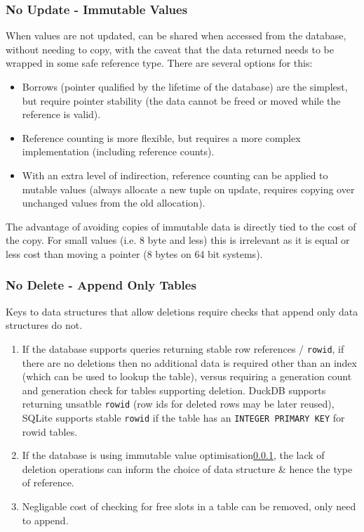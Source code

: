 \subsubsection{No Update - Immutable Values}
\label{sec:mut_opt}
When values are not updated, can be shared when accessed from the database, without needing to copy, 
with the caveat that the data returned needs to be wrapped in some safe reference type. There are several options for this:
\begin{itemize}
    \setlength\itemsep{0em}
    \item Borrows (pointer qualified by the lifetime of the database) are the simplest, but require pointer stability (the data cannot be freed or moved while the reference is valid).
    \item Reference counting is more flexible, but requires a more complex implementation (including reference counts).
    \item With an extra level of indirection, reference counting can be applied to mutable values (always allocate a new tuple on update, requires copying over unchanged values from the old allocation).
\end{itemize}
The advantage of avoiding copies of immutable data is directly tied to the cost of the copy. For small values (i.e. 8 byte and less) 
this is irrelevant as it is equal or less cost than moving a pointer (8 bytes on 64 bit systems).

\subsubsection{No Delete - Append Only Tables}
\label{sec:app_opt}
Keys to data structures that allow deletions require checks that append only data structures do not.
\begin{enumerate}
    \setlength\itemsep{0em}
    \item If the database supports queries returning stable row references / \texttt{rowid}, if there are no deletions then no additional data is required other than an index (which can be used to lookup the table), versus requiring a generation count and generation check for tables supporting deletion. DuckDB supports returning unsatble \texttt{rowid} (row ids for deleted rows may be later reused)\cite{DuckDBRowid}, SQLite supports stable \texttt{rowid} if the table has an \texttt{INTEGER PRIMARY KEY} for rowid tables\cite{SQLiteRowIDTables}.   
    \item If the database is using immutable value optimisation\ref{sec:mut_opt}, the lack of deletion operations can inform the choice of data structure \& hence the type of reference. 
    \item Negligable cost of checking for free slots in a table can be removed, only need to append.
\end{enumerate}


